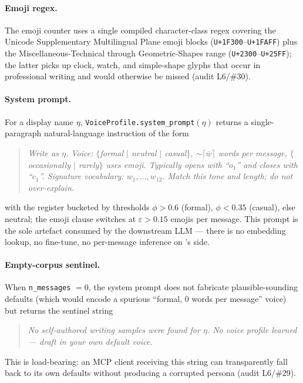 \paragraph{Emoji regex.}
The emoji counter uses a single compiled character-class regex covering
the Unicode Supplementary Multilingual Plane emoji blocks
(\texttt{U+1F300}--\texttt{U+1FAFF}) plus the Miscellaneous-Technical
through Geometric-Shapes range (\texttt{U+2300}--\texttt{U+25FF}); the
latter picks up clock, watch, and simple-shape glyphs that occur in
professional writing and would otherwise be missed (audit L6/\#30).

\paragraph{System prompt.}
For a display name $\eta$, \texttt{VoiceProfile.system\_prompt}$(\eta)$
returns a single-paragraph natural-language instruction of the form
\begin{quote}\small\itshape
Write as $\eta$. Voice: $\{$formal $\mid$ neutral $\mid$ casual$\}$,
$\sim\!\!\lceil\overline{w}\rceil$ words per message,
$\{$occasionally $\mid$ rarely$\}$ uses emoji. Typically opens with
``$o_1$'' and closes with ``$c_1$''. Signature vocabulary:
$w_1, \ldots, w_{12}$. Match this tone and length; do not over-explain.
\end{quote}
with the register bucketed by thresholds $\phi > 0.6$ (formal),
$\phi < 0.35$ (casual), else neutral; the emoji clause switches at
$\varepsilon > 0.15$ emojis per message. This prompt is the sole
artefact consumed by the downstream LLM --- there is no embedding
lookup, no fine-tune, no per-message inference on \coviber{}'s side.

\paragraph{Empty-corpus sentinel.}
When \texttt{n\_messages} $= 0$, the system prompt does not fabricate
plausible-sounding defaults (which would encode a spurious ``formal, 0
words per message'' voice) but returns the sentinel string
\begin{quote}\small\itshape
No self-authored writing samples were found for $\eta$. No voice
profile learned --- draft in your own default voice.
\end{quote}
This is load-bearing: an MCP client receiving this string can transparently
fall back to its own defaults without producing a corrupted persona
(audit L6/\#29).

